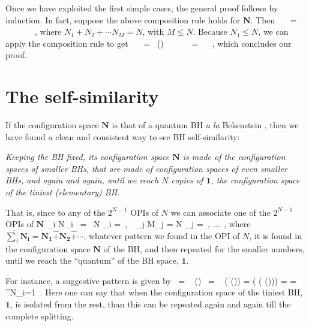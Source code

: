 \documentclass[aps,prd,showkeys,nofootinbib,superscriptaddress]{revtex4-2}
\begin{document}
Once we have exploited the first simple cases, the general proof follows by induction. In fact, suppose the above composition rule holds for $\mathbf{N}$. Then
%
\be
   \, \hat{+} \,   \ = \ \,\hat{+} \,  \, \hat{+} \,  \, \hat{+} \,  \cdots \, \hat{+}     \, ,
\ee
%
where $N_1 + N_2 + \cdots N_M=N$, with $M \leq N$. Because $N_1 \leq N$, we can apply the composition rule to get
%
\be
{} \, \hat{+} \,    \ = \ \left(\right) \, \hat{+} \,  \, \hat{+} \,  \cdots \, \hat{+}  \ = \  \, ,
\ee
%
which concludes our proof.
\section{The self-similarity}\label{sectionSelfSimilarity}

If the configuration space $\mathbf{N}$ is that of a quantum BH \textit{a la} Bekenstein \cite{bekenstein3}, then we have found a clean and consistent way to see BH self-similarity:

\textit{Keeping the BH fixed, its configuration space $\mathbf{N}$ is made of the configuration spaces of smaller BHs, that are made of configuration spaces of even smaller BHs, and again and again, until we reach $N$ copies of $\mathbf{1}$, the configuration space of the tiniest (elementary) BH.}

That is, since to any of the $2^{N-1}$ OPIs of $N$ we can associate one of the $2^{N-1}$ OPIs of $\mathbf{N}$
\be
\sum_{i} N_i \ =  \ N \to \hat{\sum}_{i}  =   \,, \,\, \sum_{j} M_j = N \to \hat{\sum}_{j}  =  \,, ... \,,
\ee
where $\hat{\sum}_{i} \mathbf{N_i} = \mathbf{N_1} \hat{+} \mathbf{N_2} \hat{+} \cdots $, whatever pattern we found in the OPI of $N$, it is found in the configuration space $\mathbf{N}$ of the BH, and then repeated for the smaller numbers, until we reach the ``quantum'' of the BH space, $\mathbf{1}$.

For instance, a suggestive pattern is given by
\be
{} \ = \  \hat{+} () \ = \  \hat{+} ( \hat{+}  ()) =  \hat{+} ( \hat{+} ( \hat{+}  ())) = \cdots
= \hat{\sum}^{N}_{i=1}  \,.
\ee
Here one can say that when the configuration space of the tiniest BH, $\mathbf{1}$, is isolated from the rest, than this can be repeated again and again till the complete splitting.
\end{document}
